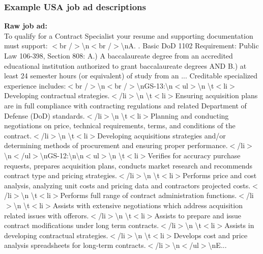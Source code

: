 \documentclass[12pt]{article}
\begin{document}
\subsubsection{Example USA job ad descriptions}\label{sec:job_ad_example}

\textbf{Raw job ad:}\\

To qualify for a Contract Specialist your resume and supporting documentation must support: $<$br /$>$\textbackslash n$<$br /$>$\textbackslash nA. . Basic DoD 1102 Requirement: Public Law 106-398, Section 808: A.) A baccalaureate degree from an accredited educational institution authorized to grant baccalaureate degrees AND B.) at least 24 semester hours (or equivalent) of study from an ... Creditable specialized experience includes:$<$br /$>$\textbackslash n$<$br /$>$\textbackslash nGS-13:\textbackslash n$<$ul$>$\textbackslash n \textbackslash t$<$li$>$Developing contractual strategies.$<$/li$>$\textbackslash n \textbackslash t$<$li$>$Ensuring acquisition plans are in full compliance with contracting regulations and related Department of Defense (DoD) standards.$<$/li$>$\textbackslash n \textbackslash t$<$li$>$Planning and conducting negotiations on price, technical requirements, terms, and conditions of the contract.$<$/li$>$\textbackslash n \textbackslash t$<$li$>$Developing acquisitions strategies and/or determining methods of procurement and ensuring proper performance.$<$/li$>$\textbackslash n$<$/ul$>$\textbackslash nGS-12:\textbackslash n\textbackslash n$<$ul$>$\textbackslash n \textbackslash t$<$li$>$Verifies for accuracy purchase requests, prepares acquisition plans, conducts market research and recommends contract type and pricing strategies.$<$/li$>$\textbackslash n \textbackslash t$<$li$>$Performs price and cost analysis, analyzing unit costs and pricing data and contractors projected costs.$<$/li$>$\textbackslash n \textbackslash t$<$li$>$Performs full range of contract administration functions.$<$/li$>$\textbackslash n \textbackslash t$<$li$>$Assists with extensive negotiations which address acquisition related issues with offerors.$<$/li$>$\textbackslash n \textbackslash t$<$li$>$Assists to prepare and issue contract modifications under long term contracts.$<$/li$>$\textbackslash n \textbackslash t$<$li$>$Assists in developing contractual strategies.$<$/li$>$\textbackslash n \textbackslash t$<$li$>$Develops cost and price analysis spreadsheets for long-term contracts.$<$/li$>$\textbackslash n$<$/ul$>$\textbackslash nE...\\
\end{document}
